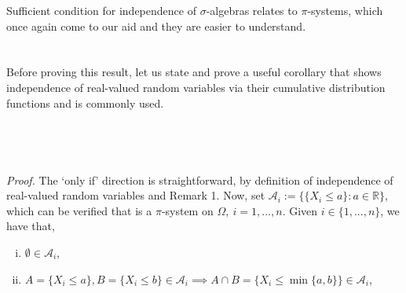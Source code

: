 \documentclass{article}
\begin{document}
Sufficient condition for independence of $\sigma$-algebras relates to $\pi$-systems, which once again come to our aid and they are easier to understand. \\\\
\noindent{}\\
Before proving this result, let us state and prove a useful corollary that shows independence of real-valued random variables via their cumulative distribution functions and is commonly used.\\\\
\noindent{}\\\\\\
\textit{Proof.} The ‘only if’ direction is straightforward, by definition of independence of real-valued random variables and Remark 1. Now, set $\mathcal{A}_i := \{\{X_i \leq a\}: a \in \mathbb{R}\}$, which can be verified that is a $\pi$-system on $\Omega, \ i=1,...,n$. Given $i \in \{1,...,n\}$, we have that,
\begin{enumerate}[(i)]
	\item $\emptyset \in \mathcal{A}_i$,
	\item $A = \{X_i \leq a\}, B = \{X_i \leq b\} \in \mathcal{A}_i \implies A \cap B = \{X_i \leq \min\{a,b\}\} \in \mathcal{A}_i$,
\end{enumerate}
\end{document}
